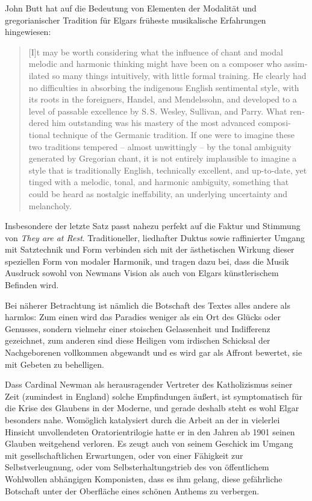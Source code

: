 \documentclass[a4paper,11pt,open=any]{scrbook}
\newcommand{\engquote}[1]{\foreignblockquote{english}{#1}}
\begin{document}
John Butt hat auf die Bedeutung von Elementen der Modalität und gregorianischer
Tradition für Elgars früheste musikalische Erfahrungen hingewiesen:
\label{butt:1}\engquote{[I]t may be worth considering what the influence
of chant and modal melodic and harmonic thinking might have been on a
composer who assimilated so many things intuitively, with little formal
training.  He clearly had no difficulties in absorbing the indigenous
English sentimental style, with its roots in the foreigners, Handel, and
Mendelssohn, and developed to a level of passable excellence by S.\,S.
Wesley, Sullivan, and Parry.  What rendered him outstanding was his
mastery of the most advanced compositional technique of the Germanic
tradition.  If one were to imagine these two traditions tempered –
almost unwittingly – by the tonal ambiguity generated by Gregorian
chant, it is not entirely implausible to imagine a style that is
traditionally English, technically excellent, and up-to-date, yet
tinged with a melodic, tonal, and harmonic ambiguity, something that
could be heard as nostalgic ineffability, an underlying uncertainty
and melancholy.\cite[S.~107f.]{butt-rcath}}
Insbesondere der letzte Satz passt nahezu perfekt auf die Faktur und Stimmung
von \textit{They are at Rest}.  Traditioneller, liedhafter Duktus sowie
raffinierter Umgang mit Satztechnik und Form verbinden sich mit der
ästhetischen Wirkung dieser speziellen Form von modaler Harmonik, und
tragen dazu bei, dass die Musik Ausdruck sowohl von Newmans Vision als
auch von Elgars künstlerischem Befinden wird.

Bei näherer Betrachtung ist nämlich die Botschaft des Textes alles andere
als harmlos: Zum einen wird das Paradies weniger als ein Ort des Glücks
oder Genusses, sondern vielmehr einer stoischen Gelassenheit und Indifferenz
gezeichnet, zum anderen sind diese Heiligen vom irdischen Schicksal der
Nachgeborenen vollkommen abgewandt und es wird gar als Affront bewertet,
sie mit Gebeten zu behelligen.

Dass Cardinal Newman als herausragender Vertreter des Katholizismus seiner
Zeit (zumindest in England) solche Empfindungen äußert, ist symptomatisch
für die Krise des Glaubens in der Moderne, und gerade deshalb steht es wohl
Elgar besonders nahe.  Womöglich katalysiert durch die Arbeit an der in
vielerlei Hinsicht unvollendeten Oratorientrilogie hatte er in den Jahren
ab 1901 seinen Glauben weitgehend verloren\cite[Zu Elgars Verhältnis zur
Religion siehe][]{adams, rushton-religion}.  Es zeugt auch von seinem
Geschick im Umgang mit gesellschaftlichen Erwartungen, oder von einer
Fähigkeit zur Selbstverleugnung, oder vom Selbsterhaltungstrieb des
von öffentlichem Wohlwollen abhängigen Komponisten, dass es ihm gelang,
diese gefährliche Botschaft unter der Oberfläche eines schönen Anthems
zu verbergen.
\end{document}
